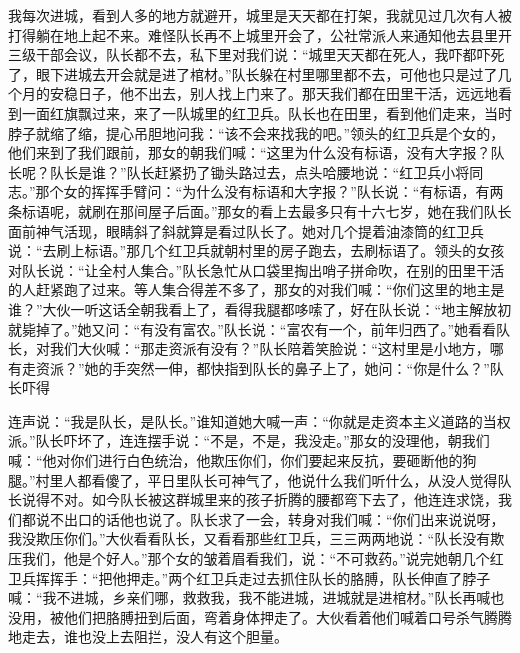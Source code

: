 \documentclass[12pt,UTF8]{ctexbook}
\begin{document}
我每次进城，看到人多的地方就避开，城里是天天都在打架，我就见过几次有人被打得躺在地上起不来。难怪队长再不上城里开会了，公社常派人来通知他去县里开三级干部会议，队长都不去，私下里对我们说：“城里天天都在死人，我吓都吓死了，眼下进城去开会就是进了棺材。”队长躲在村里哪里都不去，可他也只是过了几个月的安稳日子，他不出去，别人找上门来了。那天我们都在田里干活，远远地看到一面红旗飘过来，来了一队城里的红卫兵。队长也在田里，看到他们走来，当时脖子就缩了缩，提心吊胆地问我：“该不会来找我的吧。”领头的红卫兵是个女的，他们来到了我们跟前，那女的朝我们喊：“这里为什么没有标语，没有大字报？队长呢？队长是谁？”队长赶紧扔了锄头路过去，点头哈腰地说：“红卫兵小将同志。”那个女的挥挥手臂问：“为什么没有标语和大字报？”队长说：“有标语，有两条标语呢，就刷在那间屋子后面。”那女的看上去最多只有十六七岁，她在我们队长面前神气活现，眼睛斜了斜就算是看过队长了。她对几个提着油漆筒的红卫兵说：“去刷上标语。”那几个红卫兵就朝村里的房子跑去，去刷标语了。领头的女孩对队长说：“让全村人集合。”队长急忙从口袋里掏出哨子拼命吹，在别的田里干活的人赶紧跑了过来。等人集合得差不多了，那女的对我们喊：“你们这里的地主是谁？”大伙一听这话全朝我看上了，看得我腿都哆嗦了，好在队长说：“地主解放初就毙掉了。”她又问：“有没有富农。”队长说：“富农有一个，前年归西了。”她看看队长，对我们大伙喊：“那走资派有没有？”队长陪着笑脸说：“这村里是小地方，哪有走资派？”她的手突然一伸，都快指到队长的鼻子上了，她问：“你是什么？”队长吓得

连声说：“我是队长，是队长。”谁知道她大喊一声：“你就是走资本主义道路的当权派。”队长吓坏了，连连摆手说：“不是，不是，我没走。”那女的没理他，朝我们喊：“他对你们进行白色统治，他欺压你们，你们要起来反抗，要砸断他的狗腿。”村里人都看傻了，平日里队长可神气了，他说什么我们听什么，从没人觉得队长说得不对。如今队长被这群城里来的孩子折腾的腰都弯下去了，他连连求饶，我们都说不出口的话他也说了。队长求了一会，转身对我们喊：“你们出来说说呀，我没欺压你们。”大伙看看队长，又看看那些红卫兵，三三两两地说：“队长没有欺压我们，他是个好人。”那个女的皱着眉看我们，说：“不可救药。”说完她朝几个红卫兵挥挥手：“把他押走。”两个红卫兵走过去抓住队长的胳膊，队长伸直了脖子喊：“我不进城，乡亲们哪，救救我，我不能进城，进城就是进棺材。”队长再喊也没用，被他们把胳膊扭到后面，弯着身体押走了。大伙看着他们喊着口号杀气腾腾地走去，谁也没上去阻拦，没人有这个胆量。
\end{document}
